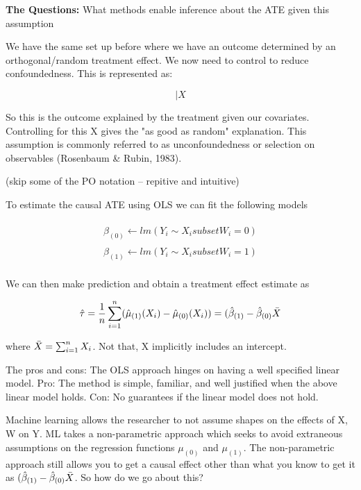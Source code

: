 \documentclass{article}
\begin{document}
\textbf{The Questions:} What methods enable inference about the ATE given this assumption

We have the same set up before where we have an outcome determined by an orthogonal/random treatment effect. We now need to control to reduce confoundedness. This is represented as:


\begin{equation}
    [{Y_i(0), Y_i(1)} \perp W_i ] | X
\end{equation}

So this is the outcome explained by the treatment given our covariates. Controlling for this X gives the "as good as random" explanation. This assumption is commonly referred to as unconfoundedness or selection on observables (Rosenbaum \& Rubin, 1983).

(skip some of the PO notation -- repitive and intuitive)

To estimate the causal ATE using OLS we can fit the following models

\begin{equation}
    \begin{aligned}
        \hat{\beta}_{(0)} \leftarrow lm(Y_i \sim X_i subset W_i =0) \\
        \hat{\beta}_{(1)} \leftarrow lm(Y_i \sim X_i subset W_i =1) \\
    \end{aligned}
\end{equation}

We can then make prediction and obtain a treatment effect estimate as 

\begin{equation}
    \hat{\tau} = \frac{1}{n} \sum_{i=1}^n (\hat{\mu}_{(1)} (X_i) - \hat{\mu}_{(0)} (X_i)) = (\hat{\beta}_{(1)} - \hat{\beta}_{(0)} \Bar{X}
\end{equation}

where $\Bar{X} = \sum_{i=1}^n X_i$. Not that, X implicitly includes an intercept.

The pros and cons: The OLS approach hinges on having a well specified linear model. Pro: The method is simple, familiar, and well justified when the above linear model holds. Con: No guarantees if the linear model does not hold.

Machine learning allows the researcher to not assume shapes on the effects of X, W on Y. ML takes a non-parametric approach which seeks to avoid extraneous assumptions on the regression functions $\mu_{(0)}$ and $\mu_{(1)}$. The non-parametric approach still allows you to get a causal effect other than what you know to get it as $(\hat{\beta}_{(1)} - \hat{\beta}_{(0)} \Bar{X}$. So how do we go about this?
\end{document}
